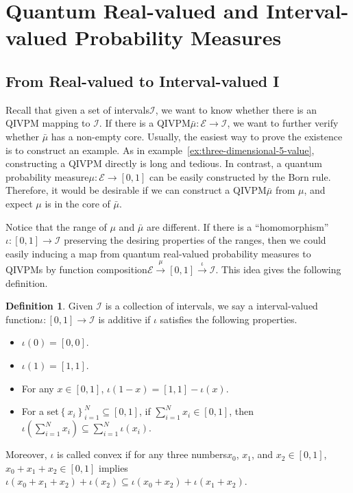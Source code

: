 \documentclass[12pt]{iopart}
\theoremstyle{plain}
\theoremstyle{definition}
\newtheorem{definition}[thm]{Definition}
\theoremstyle{remark}
\newcommand{\events}{\ensuremath{\mathcal{E}}}
\newcommand{\nb}{\nolinebreak[1] }
\begin{document}
\section{Quantum Real-valued and Interval-valued Probability Measures\label{sec:Real-and-Interval}}

\subsection{From Real-valued to Interval-valued I}

Recall that given a set of intervals\nb$\mathscr{I}$, we want to
know whether there is an QIVPM mapping to $\mathscr{I}$. If there
is a QIVPM\nb$\bar{\mu}:\events\rightarrow\mathscr{I}$, we want
to further verify whether $\bar{\mu}$ has a non-empty core. Usually,
the easiest way to prove the existence is to construct an example.
As in example~\ref{ex:three-dimensional-5-value}, constructing a
QIVPM directly is long and tedious. In contrast, a quantum probability
measure\nb$\mu:\events\rightarrow\left[0,1\right]$ can be easily
constructed by the Born rule. Therefore, it would be desirable if
we can construct a QIVPM\nb$\bar{\mu}$ from $\mu$, and expect $\mu$
is in the core of $\bar{\mu}$.

Notice that the range of $\mu$ and $\bar{\mu}$ are different. If
there is a ``homomorphism''\nb$\iota:\left[0,1\right]\rightarrow\mathscr{I}$
preserving the desiring properties of the ranges, then we could easily
inducing a map from quantum real-valued probability measures to QIVPMs
by function composition\nb$\events\overset{\mu}{\rightarrow}\left[0,1\right]\overset{\iota}{\rightarrow}\mathscr{I}$.
This idea gives the following definition.

\begin{definition}Given $\mathscr{I}$ is a collection of intervals,
we say a interval-valued function\nb$\iota:\left[0,1\right]\rightarrow\mathscr{I}$
is additive if $\iota$ satisfies the following properties. 
\begin{itemize}
\item $\iota\left(0\right)=\left[0,0\right]$. 
\item $\iota\left(1\right)=\left[1,1\right]$. 
\item For any $x\in\left[0,1\right]$, $\iota\left(1-x\right)=\left[1,1\right]-\iota\left(x\right)$. 
\item For a set\nb$\left\{ x_{i}\right\} _{i=1}^{N}\subseteq\left[0,1\right]$,
if $\sum_{i=1}^{N}x_{i}\in\left[0,1\right]$, then $\iota\left(\sum_{i=1}^{N}x_{i}\right)\subseteq\sum_{i=1}^{N}\iota\left(x_{i}\right)$. 
\end{itemize}
Moreover, $\iota$ is called convex if for any three numbers\nb$x_{0}$,
$x_{1}$, and $x_{2}\in\left[0,1\right]$, $x_{0}+x_{1}+x_{2}\in\left[0,1\right]$
implies $\iota\left(x_{0}+x_{1}+x_{2}\right)+\iota\left(x_{2}\right)\subseteq\iota\left(x_{0}+x_{2}\right)+\iota\left(x_{1}+x_{2}\right)$.\end{definition}
\end{document}
